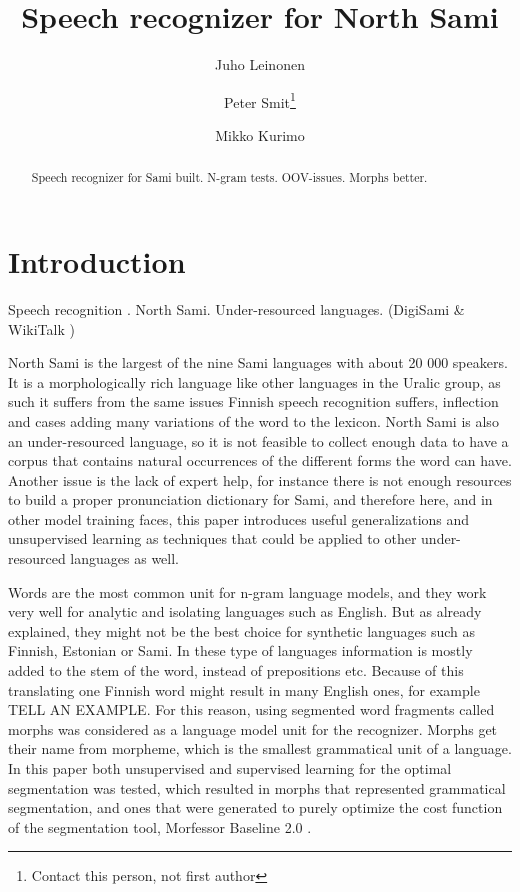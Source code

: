 \documentclass[10pt,b5paper]{article}
\begin{document}
\title{Speech recognizer for North Sami} \author{Juho Leinonen \and Peter Smit\footnote{Contact this person, not first author} \and Mikko Kurimo} \maketitle

\begin{abstract} Speech recognizer for Sami built. N-gram tests. OOV-issues. Morphs better. \end{abstract}

\section{Introduction}

Speech recognition \cite{huang2001spoken}. North Sami. Under-resourced languages. (DigiSami \& WikiTalk \cite{wilcock2013wikitalk}\cite{jokinen2014multimodal}\cite{jokinen2014open})

North Sami is the largest of the nine Sami languages with about 20 000 speakers. It is a morphologically rich language like other languages in the Uralic group, as such it suffers from the same issues Finnish speech recognition suffers, inflection and cases adding many variations of the word to the lexicon. North Sami is also an under-resourced language, so it is not feasible to collect enough data to have a corpus that contains natural occurrences of the different forms the word can have. Another issue is the lack of expert help, for instance there is not enough resources to build a proper pronunciation dictionary for Sami, and therefore here, and in other model training faces, this paper introduces useful generalizations and unsupervised learning as techniques that could be applied to other under-resourced languages as well.

Words are the most common unit for n-gram language models, and they work very well for analytic and isolating languages such as English. But as already explained, they might not be the best choice for synthetic languages such as Finnish, Estonian or Sami. In these type of languages information is mostly added to the stem of the word, instead of prepositions etc. Because of this translating one Finnish word might result in many English ones, for example TELL AN EXAMPLE. For this reason, using segmented word fragments called morphs was considered as a language model unit for the recognizer. Morphs get their name from morpheme, which is the smallest grammatical unit of a language. In this paper both unsupervised and supervised learning for the optimal segmentation was tested, which resulted in morphs that represented grammatical segmentation, and ones that were generated to purely optimize the cost function of the segmentation tool, Morfessor Baseline 2.0 \cite{virpioja2013morfessor}. 
\end{document}

